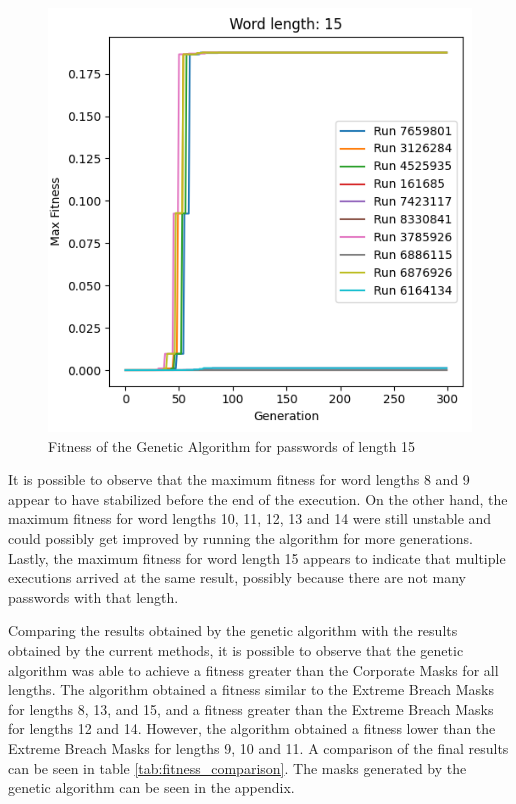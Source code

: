 \documentclass[sigconf,authordraft]{acmart}
\begin{document}
\begin{figure}
  \includegraphics[width=\columnwidth]{genetic_results_15.png}
  \caption{Fitness of the Genetic Algorithm for passwords of length 15}
  \label{fig:fitness_genetic_15}
\end{figure}

It is possible to observe that the maximum fitness for word lengths 8 and 9 appear to have stabilized before the end of the execution.
On the other hand, the maximum fitness for word lengths 10, 11, 12, 13 and 14 were still unstable and could possibly get improved by running the algorithm for more generations.
Lastly, the maximum fitness for word length 15 appears to indicate that multiple executions arrived at the same result, possibly because there are not many passwords with that length.

Comparing the results obtained by the genetic algorithm with the results obtained by the current methods, it is possible to observe that the genetic algorithm was able to achieve a fitness greater than the Corporate Masks for all lengths.
The algorithm obtained a fitness similar to the Extreme Breach Masks for lengths 8, 13, and 15, and a fitness greater than the Extreme Breach Masks for lengths 12 and 14.
However, the algorithm obtained a fitness lower than the Extreme Breach Masks for lengths 9, 10 and 11.
A comparison of the final results can be seen in table \ref{tab:fitness_comparison}.
The masks generated by the genetic algorithm can be seen in the appendix.
\end{document}
